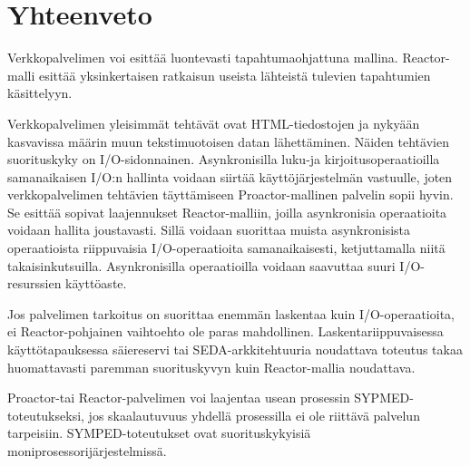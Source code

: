 \documentclass[finnish]{tktltiki2}
\theoremstyle{definition}
\theoremstyle{remark}
\begin{document}
\section{Yhteenveto}\label{sec:yhteenveto}

Verkkopalvelimen voi esittää luontevasti
tapahtumaohjattuna mallina. Reactor-malli esittää yksinkertaisen
ratkaisun useista lähteistä tulevien tapahtumien käsittelyyn.

Verkkopalvelimen yleisimmät tehtävät ovat
HTML-tiedostojen ja nykyään kasvavissa määrin
muun tekstimuotoisen datan lähettäminen.
Näiden tehtävien suorituskyky on
I/O-sidonnainen.
Asynkronisilla luku-ja kirjoitusoperaatioilla samanaikaisen I/O:n hallinta
voidaan siirtää käyttöjärjestelmän vastuulle, joten 
verkkopalvelimen tehtävien täyttämiseen Proactor-mallinen
palvelin sopii hyvin.
Se esittää sopivat laajennukset Reactor-malliin, joilla
asynkronisia operaatioita voidaan hallita joustavasti.
Sillä voidaan suorittaa muista asynkronisista operaatioista riippuvaisia I/O-operaatioita
samanaikaisesti, ketjuttamalla niitä takaisinkutsuilla.
Asynkronisilla operaatioilla voidaan saavuttaa suuri I/O-resurssien
käyttöaste.

Jos palvelimen tarkoitus on suorittaa enemmän laskentaa kuin
I/O-operaatioita, ei Reactor-pohjainen vaihtoehto ole paras mahdollinen.
Laskentariippuvaisessa käyttötapauksessa säiereservi tai SEDA-arkkitehtuuria
noudattava toteutus takaa huomattavasti paremman suorituskyvyn kuin
Reactor-mallia noudattava.

Proactor-tai Reactor-palvelimen voi laajentaa
usean prosessin SYPMED-toteutukseksi, jos skaalautuvuus
yhdellä prosessilla ei ole riittävä palvelun tarpeisiin.
SYMPED-toteutukset ovat suorituskykyisiä moniprosessorijärjestelmissä.



\end{document}
